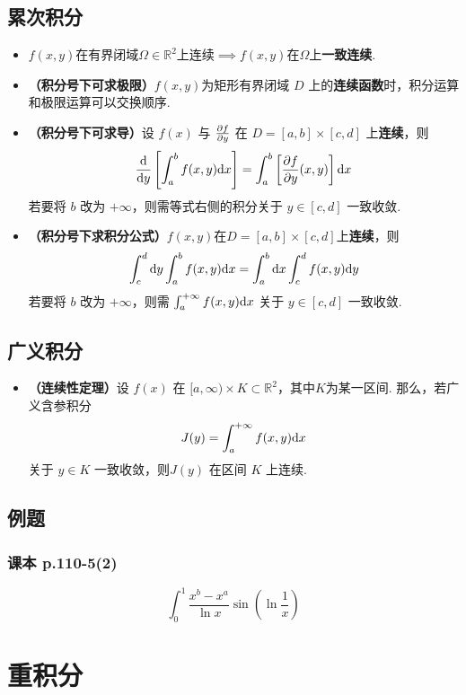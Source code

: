 \documentclass[./main.tex]{subfiles}
\begin{document}
\subsection{累次积分}
\begin{itemize}
  \item $f(x,y)$在有界闭域$\Omega\in \mathbb{R}^2$上连续$\implies f(x,y)$在$\Omega$上\textbf{一致连续}.
  \item \textbf{（积分号下可求极限）}$f(x,y)$为矩形有界闭域 $D$ 上的\textbf{连续函数}时，积分运算和极限运算可以交换顺序.
  \item \textbf{（积分号下可求导）}设 $f(x)$ 与 $\frac{\partial f}{\partial y}$ 在 $D=[a,b]\times[c,d]$ 上\textbf{连续}，则
  $$\frac{\text{d}}{\text{d}y}\left[\int_a^bf(x,y)\text{d}x\right]=\int_a^b\left[\frac{\partial f}{\partial y}(x,y)\right]\text{d}x$$
  若要将 $b$ 改为 $+\infty$，则需等式右侧的积分关于 $y\in[c,d]$ 一致收敛.
  \item \textbf{（积分号下求积分公式）}$f(x,y)$在$D=[a,b]\times[c,d]$上\textbf{连续}，则
  $$\int_c^d\text{d}y\int_a^bf(x,y)\text{d}x=\int_a^b\text{d}x\int_c^df(x,y)\text{d}y$$
  若要将 $b$ 改为 $+\infty$，则需 $\int_a^{+\infty}f(x,y)\text{d}x$ 关于 $y\in[c,d]$ 一致收敛.
\end{itemize}
\subsection{广义积分}
\begin{itemize}
  \item \textbf{（连续性定理）}设 $f(x)$ 在 $[a,\infty)\times K\subset \mathbb{R}^2$，其中$K$为某一区间. 那么，若广义含参积分 $$J(y)=\int_a^{+\infty}f(x,y)\text{d}x$$ 关于 $y\in K$ 一致收敛，则$J(y)$ 在区间 $K$ 上连续.
\end{itemize}
\subsection{例题}
\subsubsection{课本 p.110-5(2)}
\vspace{-1em}
$$\int_0^1\frac{x^b-x^a}{\ln x}\sin\left(\ln\frac{1}{x}\right)$$
\section{重积分}
\end{document}
